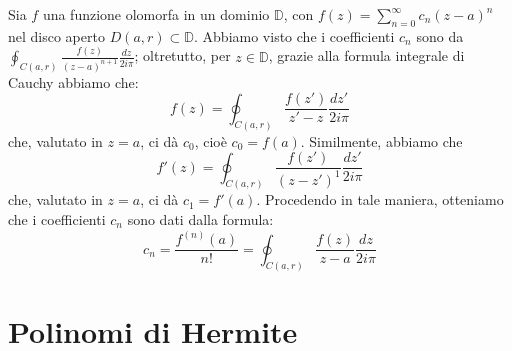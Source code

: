 Sia $f$ una funzione olomorfa in un dominio $\mathbb{D}$, con $f(z)=\sum_{n=0} ^{\infty} c_n (z-a)^n$ nel disco aperto $D(a,r) \subset \mathbb{D}$. Abbiamo visto che i coefficienti $c_n$ sono da $\oint_{C(a,r)} \frac{f(z)}{(z-a)^{n+1}} \frac{dz}{2 i \pi}$; oltretutto, per $z \in \mathbb{D}$, grazie alla formula integrale di Cauchy abbiamo che:
$$f(z)=\oint_{C(a,r)} \frac{f(z')}{z'-z} \frac{dz'}{2 i \pi}$$
che, valutato in $z=a$, ci dà $c_0$, cioè $c_0=f(a)$. 
\clearpage
Similmente, abbiamo che
$$f'(z)=\oint_{C(a,r)} \frac{f(z')}{(z-z')^1} \frac{dz'}{2 i \pi}$$
che, valutato in $z=a$, ci dà $c_1=f'(a)$. Procedendo in tale maniera, otteniamo che i coefficienti $c_n$ sono dati dalla formula:
$$c_n=\frac{f^{(n)}(a)}{n!}=\oint_{C(a,r)} \frac{f(z)}{z-a} \frac{dz}{2 i \pi}$$

\section{Polinomi di Hermite}

